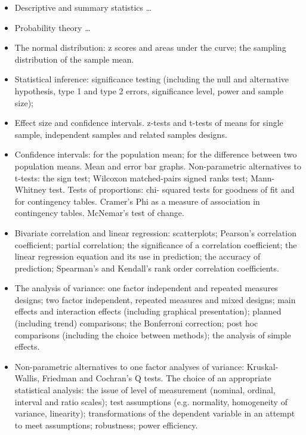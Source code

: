 \begin{frame}
	{\scriptsize
	\begin{itemize}
	\item Descriptive and summary statistics \ldots
	\item Probability theory \ldots
	\item The normal distribution: z scores and areas under the curve; the sampling distribution of the sample mean. 
	\item Statistical inference: significance testing (including the null and alternative hypothesis, type 1 and type 2 errors, significance level, power and sample size); 
	\item Effect size and confidence intervals. z-tests and t-tests of means for single sample, independent samples and related samples designs. 
	\item Confidence intervals: for the population mean; for the difference between two population means. Mean and error bar graphs. Non-parametric alternatives to t-tests: the sign test; Wilcoxon matched-pairs signed ranks test; Mann-Whitney test. Tests of proportions: chi- squared tests for goodness of fit and for contingency tables. Cramer's Phi as a measure of association in contingency tables. McNemar's test of change.
	\item Bivariate correlation and linear regression: scatterplots; Pearson's correlation coefficient; partial correlation; the significance of a correlation coefficient; the linear regression equation and its use in prediction; the accuracy of prediction; Spearman's and Kendall's rank order correlation coefficients.
	\item The analysis of variance: one factor independent and repeated measures designs; two factor independent, repeated measures and mixed designs; main effects and interaction effects (including graphical presentation); planned (including trend) comparisons; the Bonferroni correction; post hoc comparisons (including the choice between methods); the analysis of simple effects.
	\item Non-parametric alternatives to one factor analyses of variance: Kruskal-Wallis, Friedman and Cochran's Q tests.
The choice of an appropriate statistical analysis: the issue of level of measurement (nominal, ordinal, interval and ratio scales); test assumptions (e.g. normality, homogeneity of variance, linearity); transformations of the dependent variable in an attempt to meet assumptions; robustness; power efficiency.
	\end{itemize}
	}
\end{frame}

